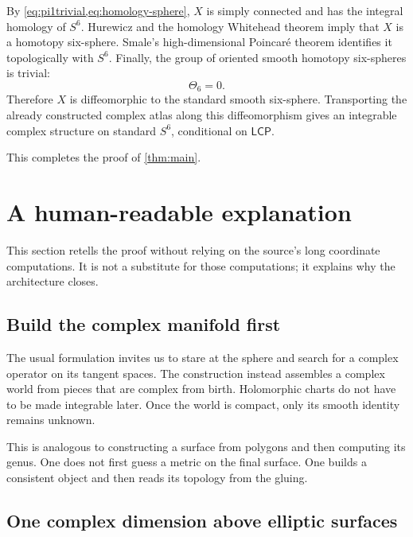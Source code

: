 \documentclass[11pt,reqno]{amsart}
\numberwithin{equation}{section}
\newcommand{\LCP}{\mathsf{LCP}}
\theoremstyle{definition}
\begin{document}
By \cref{eq:pi1trivial,eq:homology-sphere}, $X$ is simply connected and has the integral homology of $S^6$. Hurewicz and the homology Whitehead theorem imply that $X$ is a homotopy six-sphere. Smale's high-dimensional Poincar\'e theorem identifies it topologically with $S^6$. Finally, the group of oriented smooth homotopy six-spheres is trivial:
\[
\Theta_6=0.
\]
Therefore $X$ is diffeomorphic to the standard smooth six-sphere. Transporting the already constructed complex atlas along this diffeomorphism gives an integrable complex structure on standard $S^6$, conditional on $\LCP$.

This completes the proof of \cref{thm:main}.

\section{A human-readable explanation}\label{sec:explanation}

This section retells the proof without relying on the source's long coordinate computations. It is not a substitute for those computations; it explains why the architecture closes.

\subsection{Build the complex manifold first}

The usual formulation invites us to stare at the sphere and search for a complex operator on its tangent spaces. The construction instead assembles a complex world from pieces that are complex from birth. Holomorphic charts do not have to be made integrable later. Once the world is compact, only its smooth identity remains unknown.

This is analogous to constructing a surface from polygons and then computing its genus. One does not first guess a metric on the final surface. One builds a consistent object and then reads its topology from the gluing.

\subsection{One complex dimension above elliptic surfaces}
\end{document}

